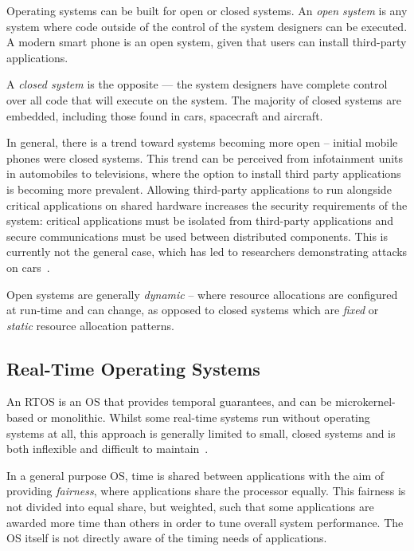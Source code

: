 Operating systems can be built for open or closed systems.
An \emph{open system} is any system where code outside of the control of the system designers can be executed.
A modern smart phone is an open system, given that users can install third-party applications.

A \emph{closed system} is the opposite --- the system designers have complete control over all code that will execute on the system.
The majority of closed systems are embedded, including those found in cars, spacecraft and aircraft.

In general, there is a trend toward systems becoming more open -- initial mobile phones were closed systems.
This trend can be perceived from infotainment units in automobiles to televisions, where the option to install third party applications is becoming more prevalent.
Allowing third-party applications to run alongside critical applications on shared hardware increases the security requirements of the system: critical applications must be isolated from third-party applications and secure communications must be used between distributed components.
This is currently not the general case, which has led to researchers demonstrating attacks on cars~\citep{Checkoway_MKASSKCRK_11}.

Open systems are generally \emph{dynamic} -- where resource allocations are configured at run-time and can change, as opposed to closed systems which are \emph{fixed} or \emph{static} resource allocation patterns.

\subsection{Real-Time Operating Systems}

An \gls{RTOS} is an \gls{OS} that provides temporal guarantees, and can be microkernel-based or monolithic.
 Whilst some real-time systems run without operating systems at all, this approach is generally limited to small, closed systems and is both inflexible and difficult to maintain~\citep{Lui_AACBBBCLM_2004}.

 In a general purpose \gls{OS}, time is shared between applications with the aim of providing \emph{fairness}, where applications share the processor equally.
 This fairness is not divided into equal share, but weighted, such that some applications are awarded more time than others in order to tune overall system performance.
The OS itself is not directly aware of the timing needs of applications.

